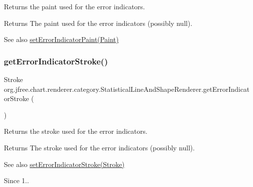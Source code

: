 Returns the paint used for the error indicators.

\begin{DoxyReturn}{Returns}
The paint used for the error indicators (possibly {\ttfamily null}).
\end{DoxyReturn}
\begin{DoxySeeAlso}{See also}
\mbox{\hyperlink{classorg_1_1jfree_1_1chart_1_1renderer_1_1category_1_1_statistical_line_and_shape_renderer_a7053e48faecf8eabb4ab8e5648ca115c}{set\+Error\+Indicator\+Paint(\+Paint)}} 
\end{DoxySeeAlso}
\mbox{\label{classorg_1_1jfree_1_1chart_1_1renderer_1_1category_1_1_statistical_line_and_shape_renderer_aa75d2c78f34a50fbf11a89fc26bb78af}} 
\subsubsection{\texorpdfstring{get\+Error\+Indicator\+Stroke()}{getErrorIndicatorStroke()}}
{\footnotesize\ttfamily Stroke org.\+jfree.\+chart.\+renderer.\+category.\+Statistical\+Line\+And\+Shape\+Renderer.\+get\+Error\+Indicator\+Stroke (\begin{DoxyParamCaption}{ }\end{DoxyParamCaption})}

Returns the stroke used for the error indicators.

\begin{DoxyReturn}{Returns}
The stroke used for the error indicators (possibly {\ttfamily null}).
\end{DoxyReturn}
\begin{DoxySeeAlso}{See also}
\mbox{\hyperlink{classorg_1_1jfree_1_1chart_1_1renderer_1_1category_1_1_statistical_line_and_shape_renderer_a488c9add706c96aa5fb2e4fcb00a7a1c}{set\+Error\+Indicator\+Stroke(\+Stroke)}}
\end{DoxySeeAlso}
\begin{DoxySince}{Since}
1.. 
\end{DoxySince}
\mbox{\label{classorg_1_1jfree_1_1chart_1_1renderer_1_1category_1_1_statistical_line_and_shape_renderer_a367bfeddca3f8f3f00d9bc6ad7975055}} 
